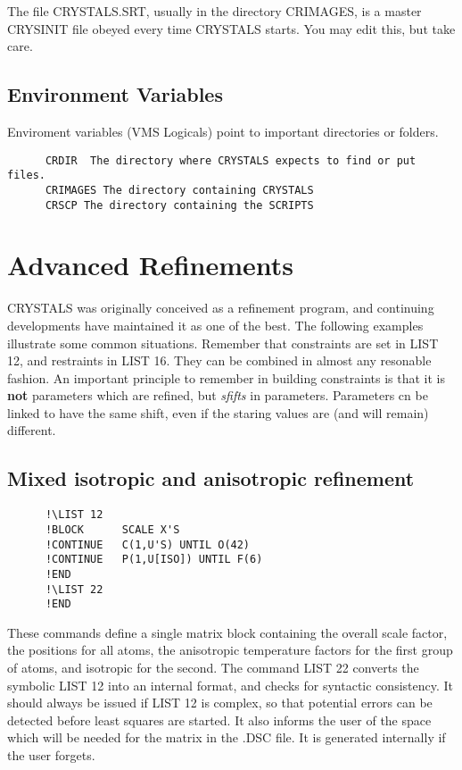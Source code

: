 \documentclass[10pt,a4paper]{report}
\begin{document}
The file CRYSTALS.SRT, usually in the directory CRIMAGES, is a master
CRYSINIT file obeyed every time CRYSTALS starts. You may edit this, but
take care.
\section{Environment Variables}
 Enviroment variables (VMS Logicals) point to important directories or
folders.
\small\begin{verbatim}
      CRDIR  The directory where CRYSTALS expects to find or put files.
      CRIMAGES The directory containing CRYSTALS
      CRSCP The directory containing the SCRIPTS
\end{verbatim}\normalsize





\chapter{Advanced Refinements}


CRYSTALS was originally conceived as a refinement program, and continuing developments have maintained it as one of the best. The following examples illustrate some common situations. Remember that  constraints are set in LIST 12, and restraints in LIST 16. They can be combined in almost any resonable fashion. An important principle to remember in building constraints is that it is {\bf not} parameters which are refined, but \emph{sfifts} in parameters. Parameters cn be linked to have the same shift, even if the staring values are (and will remain) different.

\section{Mixed isotropic and anisotropic refinement}

\small\begin{verbatim}
      !\LIST 12
      !BLOCK      SCALE X'S
      !CONTINUE   C(1,U'S) UNTIL O(42)
      !CONTINUE   P(1,U[ISO]) UNTIL F(6)
      !END
      !\LIST 22
      !END
\end{verbatim}\normalsize




These commands define a single matrix block containing the overall
 scale factor, the positions for
 all atoms, the anisotropic temperature factors for the first group of
 atoms, and isotropic for the second. The command LIST 22 converts the
 symbolic LIST 12 into an internal format, and  checks for
 syntactic consistency. It should always be issued if LIST 12 is complex, so
 that potential errors can be detected before least squares are started. It
 also informs the user of the space
 which will be needed for the matrix in the .DSC file. It is generated
 internally if the user forgets.
\end{document}
